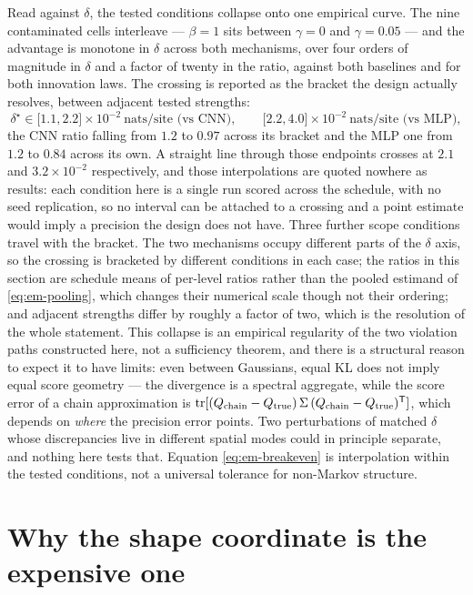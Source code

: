 Read against $\delta$, the tested conditions collapse onto one empirical
curve. The nine contaminated
cells interleave --- $\beta = 1$ sits between $\gamma = 0$ and
$\gamma = 0.05$ --- and the advantage is monotone in $\delta$ across both
mechanisms, over
four orders of magnitude in $\delta$ and a factor of twenty in the ratio,
against both baselines and for both innovation laws. The crossing is reported
as the bracket the design actually resolves, between adjacent tested
strengths:
\begin{equation}
  \delta^{\star} \in \big[1.1, 2.2\big]\times 10^{-2}\ \text{nats/site (vs CNN)},
  \qquad
  \big[2.2, 4.0\big]\times 10^{-2}\ \text{nats/site (vs MLP)} ,
  \label{eq:em-breakeven}
\end{equation}
the CNN ratio falling from $1.2$ to $0.97$ across its bracket and the MLP one
from $1.2$ to $0.84$ across its own. A straight line through those endpoints
crosses at $2.1$ and $3.2 \times 10^{-2}$ respectively, and those
interpolations are quoted nowhere as results: each condition here is a single
run scored across the schedule, with no seed replication, so no interval can
be attached to a crossing and a point estimate would imply a precision the
design does not have. Three further scope conditions travel with the bracket.
The two mechanisms occupy different parts of the $\delta$ axis, so the
crossing is bracketed by different conditions in each case; the ratios in this
section are schedule means of per-level ratios rather than the pooled estimand
of \eqref{eq:em-pooling}, which changes their numerical scale though not their
ordering; and adjacent strengths differ by roughly a factor of two, which is
the resolution of the whole statement.
This collapse is an empirical regularity of the two violation paths
constructed here, not a sufficiency theorem, and there is a structural reason
to expect it to have limits: even between Gaussians, equal KL does not imply
equal score geometry --- the divergence is a spectral aggregate, while the
score error of a chain approximation is
$\operatorname{tr}[(Q_{\mathrm{chain}}-Q_{\mathrm{true}})\,\Sigma\,
(Q_{\mathrm{chain}}-Q_{\mathrm{true}})^{\mathsf{T}}]$, which depends on \emph{where}
the precision error points. Two perturbations of matched $\delta$ whose
discrepancies live in different spatial modes could in principle separate, and
nothing here tests that. Equation \eqref{eq:em-breakeven} is interpolation
within the tested conditions, not a universal tolerance for non-Markov
structure.

\section{Why the shape coordinate is the expensive one}
\label{sec:em-shape-information}

